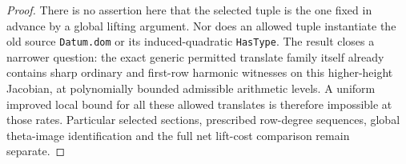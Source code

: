 \begin{proof}
There is no assertion here that the selected tuple is the one fixed in advance by a global lifting argument. Nor does an allowed tuple instantiate the old source \texttt{Datum.dom} or its induced-quadratic \texttt{HasType}. The result closes a narrower question: the exact generic permitted translate family itself already contains sharp ordinary and first-row harmonic witnesses on this higher-height Jacobian, at polynomially bounded admissible arithmetic levels. A uniform improved local bound for all these allowed translates is therefore impossible at those rates. Particular selected sections, prescribed row-degree sequences, global theta-image identification and the full net lift-cost comparison remain separate.

\end{proof}
